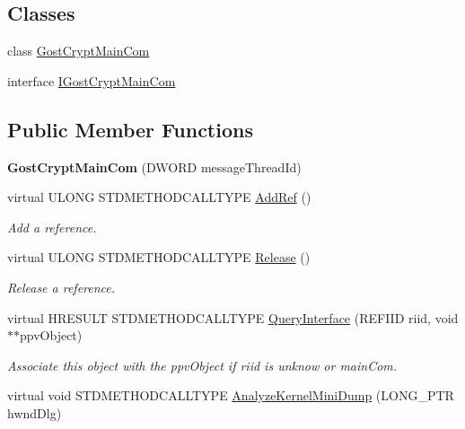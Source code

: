 \subsection*{Classes}
\begin{DoxyCompactItemize}
\item 
class \hyperlink{class_gost_crypt_main_com_1_1_gost_crypt_main_com}{Gost\+Crypt\+Main\+Com}
\item 
interface \hyperlink{interface_gost_crypt_main_com_1_1_i_gost_crypt_main_com}{I\+Gost\+Crypt\+Main\+Com}
\end{DoxyCompactItemize}
\subsection*{Public Member Functions}
\begin{DoxyCompactItemize}
\item 
\mbox{\label{class_gost_crypt_main_com_a22a1300ceea90a9593b09c4430a64c1e}} 
{\bfseries Gost\+Crypt\+Main\+Com} (D\+W\+O\+RD message\+Thread\+Id)
\item 
virtual U\+L\+O\+NG S\+T\+D\+M\+E\+T\+H\+O\+D\+C\+A\+L\+L\+T\+Y\+PE \hyperlink{class_gost_crypt_main_com_af8eb4e335bb852b40cb6d24a43fa92f3}{Add\+Ref} ()
\begin{DoxyCompactList}\small\item\em Add a reference. \end{DoxyCompactList}\item 
virtual U\+L\+O\+NG S\+T\+D\+M\+E\+T\+H\+O\+D\+C\+A\+L\+L\+T\+Y\+PE \hyperlink{class_gost_crypt_main_com_ae0b2e0989537d56b294a5bf34f46f7b4}{Release} ()
\begin{DoxyCompactList}\small\item\em Release a reference. \end{DoxyCompactList}\item 
virtual H\+R\+E\+S\+U\+LT S\+T\+D\+M\+E\+T\+H\+O\+D\+C\+A\+L\+L\+T\+Y\+PE \hyperlink{class_gost_crypt_main_com_a9bebb998c60ef2b24d0d4fcc9e514db3}{Query\+Interface} (R\+E\+F\+I\+ID riid, void $\ast$$\ast$ppv\+Object)
\begin{DoxyCompactList}\small\item\em Associate this object with the ppv\+Object if riid is unknow or main\+Com. \end{DoxyCompactList}\item 
virtual void S\+T\+D\+M\+E\+T\+H\+O\+D\+C\+A\+L\+L\+T\+Y\+PE \hyperlink{class_gost_crypt_main_com_aaf1b9fb1912523bdca4f2304839445c0}{Analyze\+Kernel\+Mini\+Dump} (L\+O\+N\+G\+\_\+\+P\+TR hwnd\+Dlg)
$$
\end{DoxyCompactItemize}
